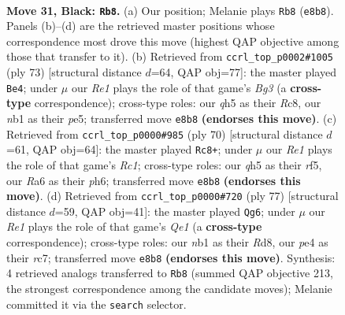 \documentclass[11pt]{article}
\begin{document}
\clearpage

\begin{figure}[p]\centering
\begin{subfigure}{0.46\textwidth}\centering
\resizebox{\linewidth}{!}{%
\newchessgame
\chessboard[
  setfen={4r1k1/2pq1p2/r6p/2p1p1pQ/2P1P1P1/3P4/7K/1NB2R2 b - - 19 31},
  showmover=false,
  pgfstyle=straightmove, color=movearrow, markmove={e8-b8}
]}
\caption{}
\end{subfigure}\hfill
\begin{subfigure}{0.46\textwidth}\centering
\resizebox{\linewidth}{!}{%
\newchessgame
\chessboard[
  setfen={2r3k1/p7/PpP1p1b1/1P1pP3/5Qpq/B5pP/6P1/3R2K1 b - - 0 37},
  showmover=false,
  pgfstyle=straightmove, color=movearrow, markmove={g6-e4}
]}
\caption{}
\end{subfigure}
\\[4pt]
\begin{subfigure}{0.46\textwidth}\centering
\resizebox{\linewidth}{!}{%
\newchessgame
\chessboard[
  setfen={6k1/6p1/p3p2p/3pPr2/1P6/P2QP1qP/6P1/2R3K1 w - - 0 36},
  showmover=false,
  pgfstyle=straightmove, color=movearrow, markmove={c1-c8}
]}
\caption{}
\end{subfigure}\hfill
\begin{subfigure}{0.46\textwidth}\centering
\resizebox{\linewidth}{!}{%
\newchessgame
\chessboard[
  setfen={3rq1k1/2R3p1/1p2p3/pP1p3p/4nP1P/4P1PB/1P5K/3Q4 b - - 11 39},
  showmover=false,
  pgfstyle=straightmove, color=movearrow, markmove={e8-g6}
]}
\caption{}
\end{subfigure}
\caption{\textbf{Move 31, Black: \texttt{Rb8}.} (a) Our position; Melanie plays \texttt{Rb8} (\texttt{e8b8}). Panels (b)--(d) are the retrieved master positions whose correspondence most drove this move (highest QAP objective among those that transfer to it). (b) Retrieved from \texttt{ccrl\_top\_p0002\#1005} (ply 73) [structural distance $d$=64, QAP obj=77]: the master played \texttt{Be4}; under $\mu$ our \emph{Re1} plays the role of that game's \emph{Bg3} (a \textbf{cross-type} correspondence); cross-type roles: our \emph{q}h5 as their \emph{R}c8, our \emph{n}b1 as their \emph{p}e5; transferred move \texttt{e8b8} \textbf{(endorses this move)}. (c) Retrieved from \texttt{ccrl\_top\_p0000\#985} (ply 70) [structural distance $d$=61, QAP obj=64]: the master played \texttt{Rc8+}; under $\mu$ our \emph{Re1} plays the role of that game's \emph{Rc1}; cross-type roles: our \emph{q}h5 as their \emph{r}f5, our \emph{R}a6 as their \emph{p}h6; transferred move \texttt{e8b8} \textbf{(endorses this move)}. (d) Retrieved from \texttt{ccrl\_top\_p0000\#720} (ply 77) [structural distance $d$=59, QAP obj=41]: the master played \texttt{Qg6}; under $\mu$ our \emph{Re1} plays the role of that game's \emph{Qe1} (a \textbf{cross-type} correspondence); cross-type roles: our \emph{n}b1 as their \emph{R}d8, our \emph{p}e4 as their \emph{r}c7; transferred move \texttt{e8b8} \textbf{(endorses this move)}. Synthesis: 4 retrieved analogs transferred to \texttt{Rb8} (summed QAP objective 213, the strongest correspondence among the candidate moves); Melanie committed it via the \texttt{search} selector.}
\label{fig:thought-m61}
\end{figure}
\end{document}
